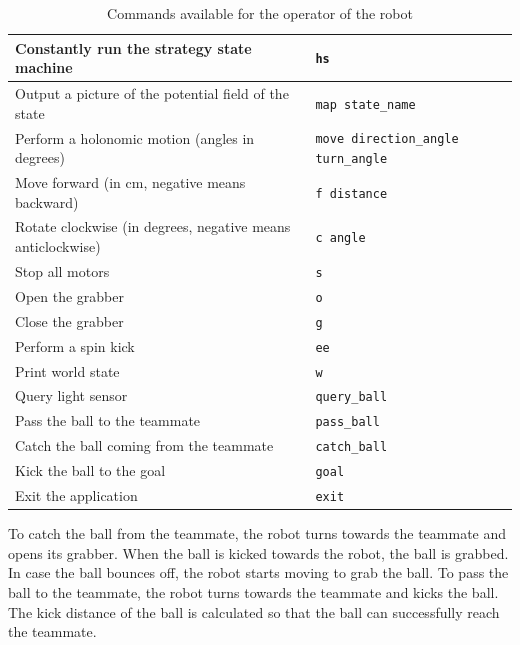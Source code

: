 \documentclass[a4paper,12pt]{article}
\begin{document}
\begin{table}[h!]
\centering
\begin{tabular}{ | p{9cm} | p{6.2cm} | }
    \hline
    Constantly run the strategy state machine &
    \small{\texttt{hs}} \\ \hline
    Output a picture of the potential field of the state &
    \small{\texttt{map state\_name}} \\ \hline
    Perform a holonomic motion (angles in degrees) &
    \small{\texttt{move direction\_angle turn\_angle}} \\ \hline
    Move forward (in cm, negative means backward) &
    \small{\texttt{f distance}} \\ \hline
    Rotate clockwise (in degrees, negative means anticlockwise) &
    \small{\texttt{c angle}} \\ \hline
    Stop all motors &
    \small{\texttt{s}} \\ \hline
    Open the grabber &
    \small{\texttt{o}} \\ \hline
    Close the grabber &
    \small{\texttt{g}} \\ \hline
    Perform a spin kick &
    \small{\texttt{ee}} \\ \hline
    Print world state &
    \small{\texttt{w}} \\ \hline
    Query light sensor &
    \small{\texttt{query\_ball}} \\ \hline
    Pass the ball to the teammate &
    \small{\texttt{pass\_ball}} \\ \hline
    Catch the ball coming from the teammate &
    \small{\texttt{catch\_ball}} \\ \hline
    Kick the ball to the goal &
    \small{\texttt{goal}} \\ \hline
    Exit the application &
    \small{\texttt{exit}} \\ \hline
\end{tabular}
\caption{Commands available for the operator of the robot}
\label{tab:commands}
\end{table}

To catch the ball from the teammate, the robot turns towards the teammate and opens its grabber. When the ball is kicked towards the robot, the ball is grabbed. In case the ball bounces off, the robot starts moving to grab the ball. To pass the ball to the teammate, the robot turns towards the teammate and kicks the ball. The kick distance of the ball is calculated so that the ball can successfully reach the teammate.
\end{document}
